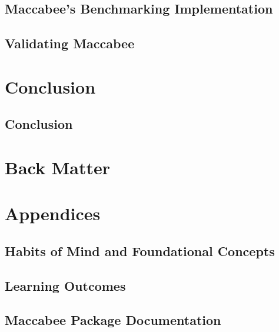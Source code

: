 \documentclass[oneside, fleqn]{book}
\begin{document}
\chapter{Maccabee's Benchmarking Implementation}
\label{chap:macimplementation}

\chapter{Validating Maccabee}
\label{chap:macvalidation}


\part{Conclusion}
\chapter{Conclusion}
\label{chap:conclusion}



\singlespacing %

\part{Back Matter}


\part{Appendices}
\appendix %

\chapter{Habits of Mind and Foundational Concepts}
\label{app:hc-tags}


\chapter{Learning Outcomes}
\label{app:lo-tags}


\chapter{Maccabee Package Documentation}
\label{app:package-docs}

\end{document}
